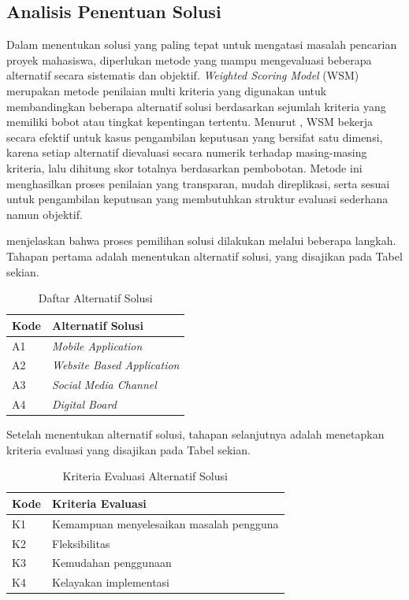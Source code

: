 \subsection{Analisis Penentuan Solusi}
Dalam menentukan solusi yang paling tepat untuk mengatasi masalah pencarian proyek mahasiswa, diperlukan metode yang mampu mengevaluasi beberapa alternatif secara sistematis dan objektif. \textit{Weighted Scoring Model} (WSM) merupakan metode penilaian multi kriteria yang digunakan untuk membandingkan beberapa alternatif solusi berdasarkan sejumlah kriteria yang memiliki bobot atau tingkat kepentingan tertentu. Menurut \textcite{MarketSegmentationAssessment2022}, WSM bekerja secara efektif untuk kasus pengambilan keputusan yang bersifat satu dimensi, karena setiap alternatif dievaluasi secara numerik terhadap masing-masing kriteria, lalu dihitung skor totalnya berdasarkan pembobotan. Metode ini menghasilkan proses penilaian yang transparan, mudah direplikasi, serta sesuai untuk pengambilan keputusan yang membutuhkan struktur evaluasi sederhana namun objektif. 

\textcite{MarketSegmentationAssessment2022} menjelaskan bahwa proses pemilihan solusi dilakukan melalui beberapa langkah. Tahapan pertama adalah menentukan alternatif solusi, yang disajikan pada Tabel sekian.
\begin{table}[h]
\centering
\begin{tabular}{|p{2cm}|p{10cm}|}
\hline
\textbf{Kode} & \textbf{Alternatif Solusi} \\
\hline
A1 & \textit{Mobile Application} \\
\hline
A2 & \textit{Website Based Application} \\
\hline
A3 & \textit{Social Media Channel} \\
\hline
A4 & \textit{Digital Board} \\
\hline
\end{tabular}
\caption{Daftar Alternatif Solusi}
\label{tbl:alternatif-solusi}
\end{table}

Setelah menentukan alternatif solusi, tahapan selanjutnya adalah menetapkan kriteria evaluasi yang disajikan pada Tabel sekian.
\begin{table}[h]
\centering
\begin{tabular}{|p{2cm}|p{10cm}|}
\hline
\textbf{Kode} & \textbf{Kriteria Evaluasi} \\
\hline
K1 & Kemampuan menyelesaikan masalah pengguna \\
\hline
K2 & Fleksibilitas \\
\hline
K3 & Kemudahan penggunaan \\
\hline
K4 & Kelayakan implementasi \\
\hline
\end{tabular}
\caption{Kriteria Evaluasi Alternatif Solusi}
\label{tbl:kriteria-evaluasi}
\end{table}

